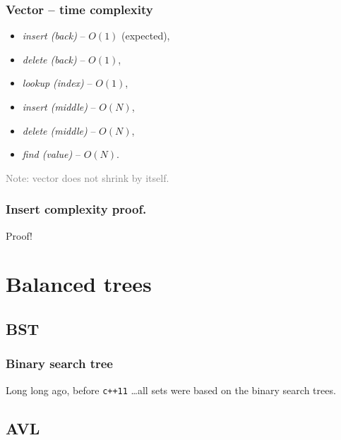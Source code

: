 \documentclass{beamer}
\begin{document}
\begin{frame}
    \frametitle{Vector -- time complexity}
    \begin{itemize}
        \item \textit{insert (back)} \pause -- $O(1)$ (expected), \pause
        \item \textit{delete (back)} \pause -- $O(1)$, \pause
        \item \textit{lookup (index)} \pause -- $O(1)$, \pause
        \item \textit{insert (middle)} -- $O(N)$,
        \item \textit{delete (middle)} -- $O(N)$,
        \item \textit{find (value)} -- $O(N)$.
    \end{itemize}

    \pause
    \textcolor{gray}{
        Note: vector does not shrink by itself.
    }
\end{frame}

\begin{frame}
    \frametitle{Insert complexity proof.}
    Proof!
\end{frame}

\section{Balanced trees}

\subsection{BST}

\begin{frame}
    \frametitle{Binary search tree}
    Long long ago, before \texttt{c++11} \dots \pause all sets were based
    on the binary search trees.

    \centering
\end{frame}

\subsection{AVL}
\end{document}
